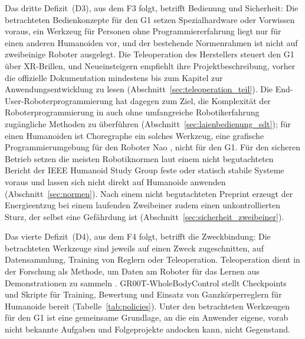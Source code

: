 Das dritte Defizit~(D3), aus dem F3 folgt, betrifft Bedienung und Sicherheit: Die betrachteten Bedienkonzepte für den G1 setzen Spezialhardware oder Vorwissen voraus, ein Werkzeug für Personen ohne Programmiererfahrung liegt nur für einen anderen Humanoiden vor, und der bestehende Normenrahmen ist nicht auf zweibeinige Roboter ausgelegt.
Die Teleoperation des Herstellers steuert den G1 über XR-Brillen, und Neueinsteigern empfiehlt ihre Projektbeschreibung, vorher die offizielle Dokumentation mindestens bis zum Kapitel zur Anwendungsentwicklung zu lesen \cite{UnitreeXRTeleop} (Abschnitt~\ref{sec:teleoperation_teil}).
Die End-User-Roboter\-pro\-gram\-mie\-rung hat dagegen zum Ziel, die Komplexität der Roboterprogrammierung in auch ohne umfangreiche Robotikerfahrung zugängliche Methoden zu überführen \cite{Ajaykumar2021} (Abschnitt~\ref{sec:laienbedienung_sdt}); für einen Humanoiden ist Choregraphe ein solches Werkzeug, eine grafische Programmierumgebung für den Roboter Nao \cite{Pot2009}, nicht für den G1.
Für den sicheren Betrieb setzen die meisten Robotiknormen laut einem nicht begutachteten Bericht der IEEE Humanoid Study Group feste oder statisch stabile Systeme voraus \cite{Prather2025} und lassen sich nicht direkt auf Humanoide anwenden \cite{Prather2025} (Abschnitt~\ref{sec:normen}).
Nach einem nicht begutachteten Preprint erzeugt der Energieentzug bei einem laufenden Zweibeiner zudem einen unkontrollierten Sturz, der selbst eine Gefährdung ist \cite{Ding2026} (Abschnitt~\ref{sec:sicherheit_zweibeiner}).

Das vierte Defizit~(D4), aus dem F4 folgt, betrifft die Zweckbindung: Die betrachteten Werkzeuge sind jeweils auf einen Zweck zugeschnitten, auf Datensammlung, Training von Reglern oder Teleoperation.
Teleoperation dient in der Forschung als Methode, um Daten am Roboter für das Lernen aus Demonstrationen zu sammeln \cite{Cheng2024}.
GR00T-WholeBodyControl stellt Checkpoints und Skripte für Training, Bewertung und Einsatz von Ganzkörperreglern für Humanoide bereit \cite{NvidiaGR00TWBC} (Tabelle~\ref{tab:policies}).
Unter den betrachteten Werkzeugen für den G1 ist eine gemeinsame Grundlage, an die ein Anwender eigene, vorab nicht bekannte Aufgaben und Folgeprojekte andocken kann, nicht Gegenstand.

